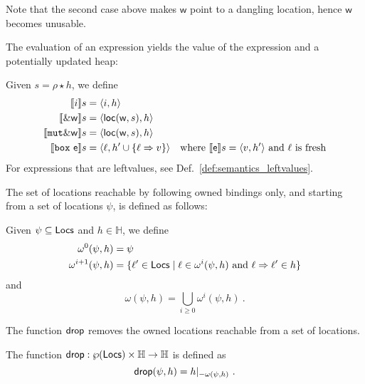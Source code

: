 \noindent
Note that the second case above makes $\mathsf{w}$ point to a dangling location, hence
$\mathsf{w}$ becomes unusable.

The evaluation of an expression yields the value of the expression and a potentially updated heap:

\begin{definition}\label{def:semantics_expressions}
  Given $s=\rho\star h$, we define
  \begin{align*}
    \den[i]{s}&=\langle i,h\rangle\\
    \den[\borrow\mathsf{w}]{s}&=\langle\loc(\mathsf{w},s),h\rangle\\
    \den[\mathtt{mut}\borrow\mathsf{w}]{s}&=\langle\loc(\mathsf{w},s),h\rangle\\
    \den[\mathtt{box}\ \mathsf{e}]{s}&=\langle\ell,h'\cup\{\ell\Rightarrow v\}\rangle
    & \text{where $\den[\mathsf{e}]{s}=\langle v, h'\rangle$ and $\ell$ is fresh}
  \end{align*}
  For expressions that are leftvalues, see Def.~\ref{def:semantics_leftvalues}.
\end{definition}

The set of locations reachable by following owned bindings only, and starting from a set of locations $\psi$,
is defined as follows:
%
\begin{definition}
  Given $\psi\subseteq\Locs$ and $h\in\mathbb{H}$, we define
  \begin{align*}
  \omega^0(\psi,h)&=\psi\\ %
  \omega^{i+1}(\psi,h)&=\{\ell'\in\Locs\mid\ell\in\omega^i(\psi,h)\text{ and }\ell\Rightarrow\ell'\in h\}
  \end{align*}
  and
  \[
  \omega(\psi,h)=\bigcup\limits_{i\ge 0}\omega^i(\psi,h)~.
  \]
\end{definition}

The function $\drop$ removes the owned locations reachable from a set of locations.
%
\begin{definition}[Drop]\label{def:drop}
  The function $\drop:\wp(\Locs)\times\mathbb{H}\to\mathbb{H}$ is defined as
  \[
  \drop(\psi,h)=h|_{-{\omega(\psi,h)}}~.
  \]
\end{definition}

